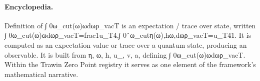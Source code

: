\paragraph{Encyclopedia.}
Definition of ∫ 0ω\_cut(ω)ωdωρ\_vacT is an expectation / trace over state, written ∫ 0ω\_cut(ω)ωdωρ\_vacT=frac1u\_T4,∫ 0ˆω\_cutη(ω),ħω,dωρ\_vacT=u\_T41. It is computed as an expectation value or trace over a quantum state, producing an observable. It is built from η, ω, ħ, u\_, v, a, defining ∫ 0ω\_cut(ω)ωdωρ\_vacT. Within the Trawin Zero Point registry it serves as one element of the framework's mathematical narrative.
